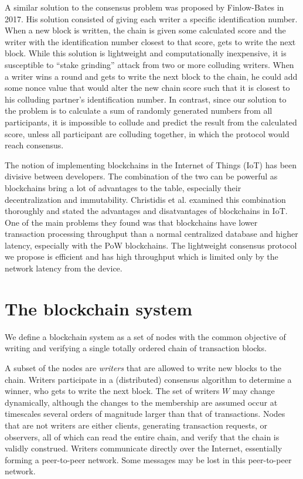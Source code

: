 \documentclass[10pt]{article}
\begin{document}
A similar solution to the consensus problem was proposed by Finlow-Bates \cite{finlow2017lightweight} in 2017. His solution consisted of giving each writer a specific identification number. When a new block is written, the chain is given some calculated score and the writer with the identification number closest to that score, gets to write the next block.
While this solution is lightweight and computationally inexpensive, it is susceptible to ``stake grinding'' \cite{onstake} attack from two or more colluding writers. When a writer wins a round and gets to write the next block to the chain, he could add some nonce value that would alter the new chain score such that it is closest to his colluding partner's identification number. 
In contrast, since our solution to the problem is to calculate a sum of randomly generated numbers from all participants, it is impossible to collude and predict the result from the calculated score, unless all participant are colluding together, in which the protocol would reach consensus.

The notion of implementing blockchains in the Internet of Things (IoT) has been divisive between developers. The combination of the two can be powerful as blockchains bring a lot of advantages to the table, especially their decentralization and immutability. Christidis et al.\cite{christidis2016blockchains} examined this combination thoroughly and stated the advantages and disatvantages of blockchains in IoT. One of the main problems they found was that blockchains have lower transaction processing throughput than a normal centralized database and higher latency, especially with the PoW blockchains. The lightweight consensus protocol we propose is efficient and has high throughput which is limited only by the network latency from the device.



\section{The blockchain system}

We define a blockchain system as a set of nodes with the common objective of writing and verifying a single totally ordered chain of transaction blocks. 

A subset of the nodes are \emph{writers} that are allowed to write new blocks to the chain. Writers participate in a (distributed) consensus algorithm to determine a winner, who gets to write the next block. The set of writers $W$ may change dynamically, although  the changes to the membership are assumed occur at timescales several orders of magnitude larger than that of transactions.  
Nodes that are not writers are  either clients, generating transaction requests, or observers, all of which can read the entire chain, and verify that the chain is validly construed. %
Writers communicate directly over the Internet, essentially forming a peer-to-peer network. Some messages may be lost in this peer-to-peer network. 
\end{document}

